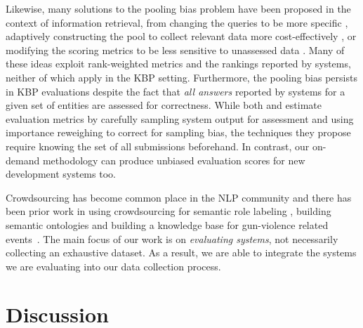 Likewise, many solutions to the pooling bias problem have been proposed in the context of information retrieval, from 
  changing the queries to be more specific \citep{buckley2007bias}, 
  adaptively constructing the pool to collect relevant data more cost-effectively \citep{zobel1998reliable,cormack1998efficient,aslam2006statistical}, or
  modifying the scoring metrics to be less sensitive to unassessed data \citep{buckley2004incomplete,sakai2008information,aslam2006statistical}.
Many of these ideas exploit rank-weighted metrics and the rankings reported by systems, neither of which apply in the KBP setting. Furthermore, the pooling bias persists in KBP evaluations despite the fact that \textit{all answers} reported by systems for a given set of entities are assessed for correctness.
While both \citet{aslam2006statistical} and \citet{yilmaz2008simple} estimate evaluation metrics by carefully sampling system output for assessment and using importance reweighing to correct for sampling bias,
  the techniques they propose require knowing the set of all submissions beforehand.
In contrast, our on-demand methodology can produce unbiased evaluation scores for new development systems too.

Crowdsourcing has become common place in the NLP community and there has been prior work in using crowdsourcing for semantic role labeling \citep{he2015question}, building semantic ontologies \citep{vannella2014validating} and building a knowledge base for gun-violence related events~\cite{pavlick2016gun}.
The main focus of our work is on \textit{evaluating systems}, not necessarily collecting an exhaustive dataset. As a result, we are able to integrate the systems we are evaluating into our data collection process.

\section{Discussion}
\label{sec:discussion}

